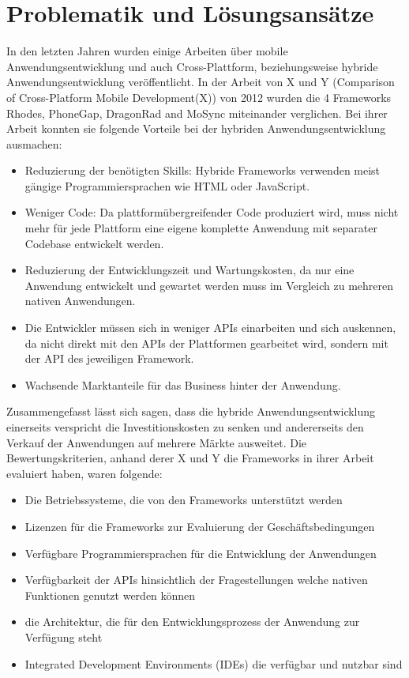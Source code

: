 \chapter{Problematik und Lösungsansätze}

In den letzten Jahren wurden einige Arbeiten über mobile Anwendungsentwicklung und auch Cross-Plattform, beziehungsweise hybride Anwendungsentwicklung veröffentlicht. In der Arbeit von X und Y (Comparison of Cross-Platform Mobile Development(X)) von 2012 wurden die 4 Frameworks Rhodes, PhoneGap, DragonRad and MoSync miteinander verglichen. Bei ihrer Arbeit konnten sie folgende Vorteile bei der hybriden Anwendungsentwicklung ausmachen: 

\begin{itemize}
\item Reduzierung der benötigten Skills: Hybride Frameworks verwenden meist gängige Programmiersprachen wie HTML oder JavaScript.
\item Weniger Code: Da plattformübergreifender Code produziert wird, muss nicht mehr für jede Plattform eine eigene komplette Anwendung mit separater Codebase entwickelt werden.
\item Reduzierung der Entwicklungszeit und Wartungskosten, da nur eine Anwendung entwickelt und gewartet werden muss im Vergleich zu mehreren nativen Anwendungen. 
\item Die Entwickler müssen sich in weniger APIs einarbeiten und sich auskennen, da nicht direkt mit den APIs der Plattformen gearbeitet wird, sondern mit der API des jeweiligen Framework.
\item Wachsende Marktanteile für das Business hinter der Anwendung. 
\end{itemize}

Zusammengefasst lässt sich sagen, dass die hybride Anwendungsentwicklung einerseits verspricht die Investitionskosten zu senken und andererseits den Verkauf der Anwendungen auf mehrere Märkte ausweitet. Die Bewertungskriterien, anhand derer X und Y die Frameworks in ihrer Arbeit evaluiert haben, waren folgende: 

\begin{itemize}
\item Die Betriebssysteme, die von den Frameworks unterstützt werden
\item Lizenzen für die Frameworks zur Evaluierung der Geschäftsbedingungen
\item Verfügbare Programmiersprachen für die Entwicklung der Anwendungen
\item Verfügbarkeit der APIs hinsichtlich der Fragestellungen welche nativen Funktionen genutzt werden können
\item die Architektur, die für den Entwicklungsprozess der Anwendung zur Verfügung steht
\item Integrated Development Environments (IDEs) die verfügbar und nutzbar sind
\end{itemize}


